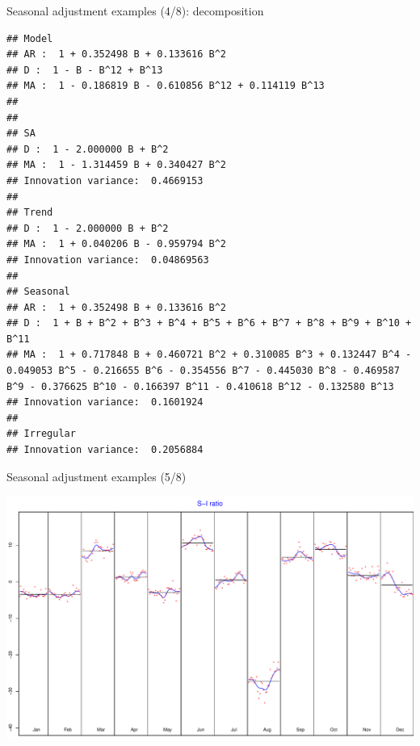 \documentclass[10pt,xcolor=table,color={dvipsnames,usenames},ignorenonframetext,usepdftitle=false,french]{beamer}
\newenvironment{Shaded}{\begin{snugshade}}{\end{snugshade}}
\newcommand{\KeywordTok}[1]{\textcolor[rgb]{0.13,0.29,0.53}{\textbf{#1}}}
\newcommand{\NormalTok}[1]{#1}
\newcommand{\OperatorTok}[1]{\textcolor[rgb]{0.81,0.36,0.00}{\textbf{#1}}}
\begin{document}
\begin{frame}[fragile]{Seasonal adjustment examples (4/8):
decomposition}
\protect\hypertarget{seasonal-adjustment-examples-48-decomposition}{}

\footnotesize

\begin{Shaded}
\end{Shaded}

\begin{verbatim}
## Model
## AR :  1 + 0.352498 B + 0.133616 B^2 
## D :  1 - B - B^12 + B^13 
## MA :  1 - 0.186819 B - 0.610856 B^12 + 0.114119 B^13 
## 
## 
## SA
## D :  1 - 2.000000 B + B^2 
## MA :  1 - 1.314459 B + 0.340427 B^2 
## Innovation variance:  0.4669153 
## 
## Trend
## D :  1 - 2.000000 B + B^2 
## MA :  1 + 0.040206 B - 0.959794 B^2 
## Innovation variance:  0.04869563 
## 
## Seasonal
## AR :  1 + 0.352498 B + 0.133616 B^2 
## D :  1 + B + B^2 + B^3 + B^4 + B^5 + B^6 + B^7 + B^8 + B^9 + B^10 + B^11 
## MA :  1 + 0.717848 B + 0.460721 B^2 + 0.310085 B^3 + 0.132447 B^4 - 0.049053 B^5 - 0.216655 B^6 - 0.354556 B^7 - 0.445030 B^8 - 0.469587 B^9 - 0.376625 B^10 - 0.166397 B^11 - 0.410618 B^12 - 0.132580 B^13 
## Innovation variance:  0.1601924 
## 
## Irregular
## Innovation variance:  0.2056884
\end{verbatim}

\end{frame}

\begin{frame}[fragile]{Seasonal adjustment examples (5/8)}
\protect\hypertarget{seasonal-adjustment-examples-58}{}

\begin{Shaded}
\end{Shaded}

\includegraphics{img/markdown-unnamed-chunk-9-1.pdf}

\end{frame}
\end{document}
